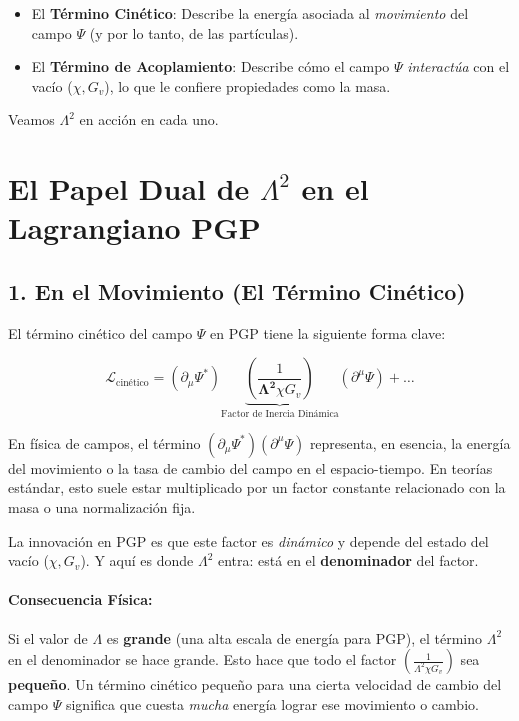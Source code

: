 \documentclass{article}
\newcommand{\LambdaSq}{\Lambda^2}
\newcommand{\Lagrangian}{\mathcal{L}}
\newcommand{\Chi}{\chi}
\newcommand{\Gv}{G_v}
\begin{document}
\begin{itemize}
    \item El \textbf{Término Cinético}: Describe la energía asociada al \emph{movimiento} del campo $\Psi$ (y por lo tanto, de las partículas).
    \item El \textbf{Término de Acoplamiento}: Describe cómo el campo $\Psi$ \emph{interactúa} con el vacío ($\chi, G_v$), lo que le confiere propiedades como la masa.
\end{itemize}

Veamos $\Lambda^2$ en acción en cada uno.

\section{El Papel Dual de $\Lambda^2$ en el Lagrangiano PGP}

\subsection{1. En el Movimiento (El Término Cinético)}

El término cinético del campo $\Psi$ en PGP tiene la siguiente forma clave:

\[
\Lagrangian_{\text{cinético}} = (\partial_\mu\Psi^*) \underbrace{\left(\frac{1}{\mathbf{\Lambda^2}\Chi \Gv}\right)}_{\text{Factor de Inercia Dinámica}} (\partial^\mu\Psi) + \dots
\]

\noindent En física de campos, el término $(\partial_\mu\Psi^*)(\partial^\mu\Psi)$ representa, en esencia, la energía del movimiento o la tasa de cambio del campo en el espacio-tiempo. En teorías estándar, esto suele estar multiplicado por un factor constante relacionado con la masa o una normalización fija.

La innovación en PGP es que este factor es \emph{dinámico} y depende del estado del vacío ($\Chi, \Gv$). Y aquí es donde $\LambdaSq$ entra: está en el \textbf{denominador} del factor.

\paragraph{Consecuencia Física:}
Si el valor de $\Lambda$ es \textbf{grande} (una alta escala de energía para PGP), el término $\LambdaSq$ en el denominador se hace grande. Esto hace que todo el factor $(\frac{1}{\LambdaSq \Chi \Gv})$ sea \textbf{pequeño}. Un término cinético pequeño para una cierta velocidad de cambio del campo $\Psi$ significa que cuesta \emph{mucha} energía lograr ese movimiento o cambio.
\end{document}
